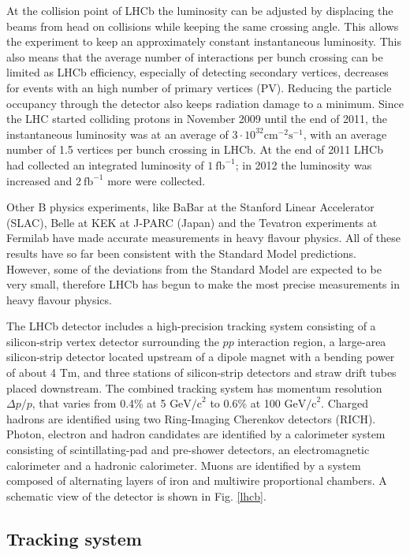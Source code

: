 At the collision point of LHCb the luminosity can be adjusted by displacing the beams from head on collisions while keeping the same
crossing angle. This allows the experiment to keep an approximately constant instantaneous luminosity. This also means that the average number of interactions per bunch crossing can be limited as LHCb efficiency, especially of detecting secondary vertices, decreases for events with an high number of primary vertices (PV). Reducing the particle occupancy through the detector also keeps radiation damage to a minimum. Since the LHC started colliding protons in
November 2009 until the end of 2011, the instantaneous luminosity was at an average of $3 \cdot 10^{32} \mbox{cm}^{-2}\mbox{s}^{-1}$, with an average number of 1.5 vertices per bunch crossing in LHCb. At the end of 2011 LHCb had collected an integrated luminosity of $1 ~\mbox{fb}^{-1}$; in 2012 the luminosity was increased and $2 ~\mbox{fb}^{-1}$ more were collected.

Other B physics experiments, like BaBar at the Stanford Linear Accelerator (SLAC), Belle at KEK at J-PARC (Japan) and the Tevatron experiments at Fermilab have made accurate measurements in heavy flavour physics. All of these results have so far been consistent with the Standard Model predictions. However, some of the deviations from the Standard Model are expected to be very small, therefore LHCb has begun to make the most precise measurements in heavy flavour physics.

The LHCb detector\cite{Alves:2008zz} includes a high-precision tracking system consisting of a silicon-strip vertex detector surrounding the $pp$ interaction region, a large-area silicon-strip detector located upstream of a dipole magnet with a bending power of about 4 Tm, and three stations of silicon-strip detectors and straw drift tubes placed downstream. The combined tracking system has momentum resolution $\Delta p/p$, that varies from 0.4\% at 5 $\mbox{GeV/c}^{2}$ to 0.6\% at 100 $\mbox{GeV/c}^{2}$.
Charged hadrons are identified using two Ring-Imaging Cherenkov detectors (RICH)\cite{LHCb-DP-2012-003}. Photon, electron and hadron candidates are identified by a calorimeter system consisting of scintillating-pad and pre-shower detectors, an electromagnetic calorimeter and a hadronic calorimeter. Muons are identified by a system composed of alternating layers of iron and multiwire proportional chambers\cite{LHCb-DP-2012-002}. A schematic view of the detector is shown in Fig. \ref{lhcb}.


\subsection{Tracking system}

